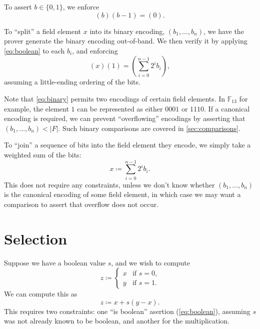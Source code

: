 \documentclass{article}
\begin{document}
To assert $b \in \{ 0, 1 \}$, we enforce
\begin{equation} \label{eq:boolean}
  (b) (b - 1) = (0).
\end{equation}

To ``split'' a field element $x$ into its binary encoding, $(b_1, \dots, b_n)$, we have the prover generate the binary encoding out-of-band. We then verify it by applying \autoref{eq:boolean} to each $b_i$, and enforcing
\begin{equation} \label{eq:binary}
  (x) (1) = \left( \sum_{i=0}^{n-1} 2^i b_i \right),
\end{equation}
assuming a little-ending ordering of the bits.

Note that \autoref{eq:binary} permits two encodings of certain field elements. In $\mathbb{F}_{13}$ for example, the element $1$ can be represented as either $0001$ or $1110$. If a canonical encoding is required, we can prevent ``overflowing'' encodings by asserting that $(b_1, \dots, b_n) < |F|$. Such binary comparisons are covered in \autoref{sec:comparisons}.

To ``join'' a sequence of bits into the field element they encode, we simply take a weighted sum of the bits:
\begin{equation} \label{eq:join}
  x \coloneqq \sum_{i=0}^{n-1} 2^i b_i.
\end{equation}
This does not require any constraints, unless we don't know whether $(b_1, \dots, b_n)$ is the canonical encoding of some field element, in which case we may want a comparison to assert that overflow does not occur.


\section{Selection} \label{sec:selection}

Suppose we have a boolean value $s$, and we wish to compute
\begin{equation}
  z \coloneqq
  \begin{cases}
    x & \text{if $s = 0$,} \\
    y & \text{if $s = 1$.}
  \end{cases}
\end{equation}
We can compute this as
\begin{equation} \label{eq:selection}
  z \coloneqq x + s(y - x).
\end{equation}
This requires two constraints: one ``is boolean'' asertion (\autoref{eq:boolean}), assuming $s$ was not already known to be boolean, and another for the multiplication.
\end{document}
